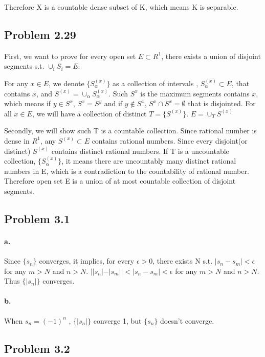 \documentclass{article}
\begin{document}
Therefore X is a countable dense subset of K, which means K is separable.

\subsection*{Problem 2.29}
First, we want to prove for every open set $E \subset R^1$, there exists a union of disjoint segments s.t. $ \cup_i S_i = E$.

For any $ x \in E $, we denote $ \{S^{(x)}_{\alpha}\} $ as a collection of intervals , $S^{(x)}_{\alpha} \subset E$, that contains $x$, and $S^{(x)} = \cup_{\alpha} S^{(x)}_{\alpha}$.
Such $S^{x}$ is the maximum segments contains $x$, which means if $ y \in S^{x}$, $S^{x} = S^{y}$ and if $ y \not\in S^{x}$, $S^{x} \cap S^{x} = \emptyset$ that is disjointed. For all $x \in E$, we will have a collection of distinct $T = \{S^{(x)}\} $.
$ E = \cup_{T} S^{(x)}$

Secondly, we will show such T is a countable collection. Since rational number is dense in $R^1$,  any $ S^{(x)} \subset E$ contains rational numbers. Since every disjoint(or distinct) $S^{(x)}$ contains distinct rational numbers.
If T is a uncountable collection, $\{S^{(x)}_{\alpha}\} $, it means there are uncountably many distinct rational numbers in E, which is a contradiction to the countability of rational number.
Therefore open set E is a union of at most countable collection of disjoint segments.

\subsection*{Problem 3.1}
\paragraph{a.}
Since $\{ s_n \}$ converges, it implies, for every $ \epsilon >0$, there exists N s.t. $|s_n - s_m| < \epsilon$ for any $m>N$ and $n >N$.
$ ||s_n|- |s_m|| < |s_n - s_m| < \epsilon $ for any $m>N$ and $n >N$. Thus $ \{ |s_n| \}$ converges.

\paragraph{b.} When $s_n = (-1)^n$ ,  $ \{ |s_n| \}$ converge 1, but $\{ s_n \}$  doesn't converge.

\subsection*{Problem 3.2}
\end{document}
